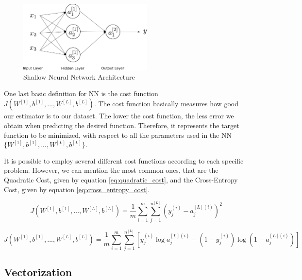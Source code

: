 \begin{figure}[H]
    \centering
    \includegraphics[width=0.6\textwidth]{Chapter4/neuralnet.pdf}
    \caption{Shallow Neural Network Architecture}
    \label{fig:nn_basic_architecture}
\end{figure}

One last basic definition for NN is the cost function $J(W^{[1]},b^{[1]},...,W^{[L]},b^{[L]})$. The cost function basically measures how good our estimator is to our dataset. The lower the cost function, the less error we obtain when predicting the desired function. Therefore, it represents the target function to be minimized, with respect to all the parameters used in the NN $\{ W^{[1]},b^{[1]},...,W^{[L]},b^{[L]} \}$.

It is possible to employ several different cost functions according to each specific problem. However, we can mention the most common ones, that are the Quadratic Cost, given by equation \ref{eq:quadratic_cost}, and the Cross-Entropy Cost, given by equation \ref{eq:cross_entropy_cost}.

\begin{equation}
J(W^{[1]},b^{[1]},...,W^{[L]},b^{[L]}) = \frac{1}{m} \sum_{i=1}^{m}{\sum_{j=1}^{n^{[L]}}{ (y_j^{(i)} - a_j^{[L](i)})^2 }}
\label{eq:quadratic_cost}
\end{equation}

\begin{equation}
J(W^{[1]},b^{[1]},...,W^{[L]},b^{[L]}) = \frac{1}{m} \sum_{i=1}^{m}{\sum_{j=1}^{n^{[L]}}{ \left[ y_j^{(i)}\log{a_j^{[L](i)}} - (1-y_j^{(i)}) \log{ (1 - a_j^{[L](i)}) } \right] }}
\label{eq:cross_entropy_cost}
\end{equation}


\subsection{Vectorization}

